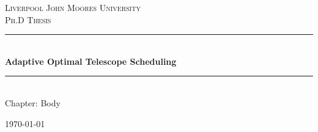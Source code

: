 \documentclass[12pt,a4paper]{article}
\newcommand{\HRule}{\rule{\linewidth}{0.5mm}}
\numberwithin{figure}{section}
\numberwithin{table}{section}
\numberwithin{algorithm}{section}
\begin{document}
\setlength{\parindent}{5mm}
\setlength{\parskip}{10pt plus2mm minus2mm}
\thispagestyle{empty}

\begin{titlepage}
 
\begin{center}
 
\textsc{\LARGE Liverpool John Moores University}\\[1.5cm]
 
\textsc{\Large Ph.D Thesis}\\[0.5cm]
 
 
\HRule \\[0.4cm]
{ \Large \bfseries Adaptive Optimal Telescope Scheduling}\\[0.4cm]
 
\HRule \\[1.5cm]
 
{ \large Chapter: Body}
 
\vfill
 
{\large \today}
 
\end{center}
 
\end{titlepage}


\end{document}
